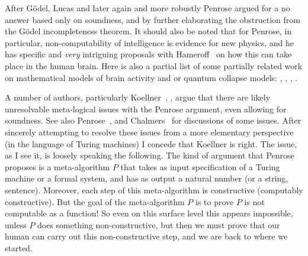 \documentclass{amsart}  %
\numberwithin{equation}{section}
\theoremstyle{definition}
\theoremstyle{remark}
\begin{document}
{After G\"odel, Lucas \cite{citeLucas} and later again and more robustly Penrose \cite{citePenroseBeyondShadow} argued for a no answer based only on soundness, and by further elaborating the obstruction from the G\"odel incompleteness theorem.   
It should also be noted that for Penrose, in particular, non-computability of intelligence is evidence for new physics, and he has specific and \emph{very} intriguing proposals with Hameroff~\cite{citeHAMEROFF201439} on how this can take place in the human brain.  Here is also a partial list of some partially related work on mathematical models of brain activity and or quantum collapse models: \cite{cite:Quanta}, \cite{citeKremnizer2015}, \cite{citeHoffmanAgents}, \cite{cite:GrindfordConsciousnessPerspective}.

A number of authors, particularly Koellner~\cite{citeKoellner2018-KOEOTQ-3}, \cite{citeKoellnerII2018-KOEOTQ-4}, argue that there are likely unresolvable meta-logical issues with the Penrose argument, even allowing for soundness. See also Penrose~\cite{citePenroseBeyondShadow}, and Chalmers~\cite{citeChalmers} for discussions of some issues. After sincerely attempting to resolve these issues from a more elementary perspective (in the language of Turing machines) I concede that Koellner is right.  
The issue, as I see it, is loosely speaking the following. The kind of argument that Penrose proposes is a meta-algorithm $P$ that takes as input specification of a Turing machine or a formal system, and has as output a natural number (or a string, sentence).  Moreover, each step of this meta-algorithm is constructive (computably constructive). But the goal of the meta-algorithm $P$ is to prove $P$ is not computable as a function! So even on this surface level this appears impossible, unless $P$ does something non-constructive, but then we must prove that our human can carry out this non-constructive step, and we are back to where we started.

}
\end{document}
